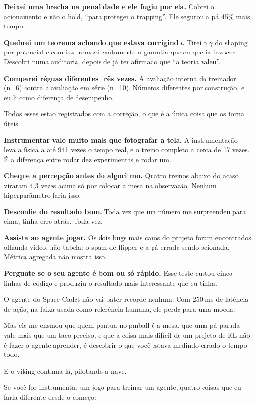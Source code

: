 \documentclass[10pt,a4paper,twoside,twocolumn]{scrartcl}
\begin{document}
\textbf{Deixei uma brecha na penalidade e ele fugiu por ela.} Cobrei o
acionamento e não o hold, ``para proteger o trapping''. Ele segurou a pá
45\% mais tempo.

\textbf{Quebrei um teorema achando que estava corrigindo.} Tirei o
\(\gamma\) do shaping por potencial e com isso removi exatamente a
garantia que eu queria invocar. Descobri numa auditoria, depois de já
ter afirmado que ``a teoria valeu''.

\textbf{Comparei réguas diferentes três vezes.} A avaliação interna do
treinador (n=6) contra a avaliação em série (n=10). Números diferentes
por construção, e eu li como diferença de desempenho.

Todos esses estão registrados com a correção, o que é a única coisa que
os torna úteis.

\textbf{Instrumentar vale muito mais que fotografar a tela.} A
instrumentação leva a física a até 941 vezes o tempo real, e o treino
completo a cerca de 17 vezes. É a diferença entre rodar dez experimentos
e rodar um.

\textbf{Cheque a percepção antes do algoritmo.} Quatro treinos abaixo do
acaso viraram 4,3 vezes acima só por colocar a mesa na observação.
Nenhum hiperparâmetro faria isso.

\textbf{Desconfie do resultado bom.} Toda vez que um número me
surpreendeu para cima, tinha erro atrás. Toda vez.

\textbf{Assista ao agente jogar.} Os dois bugs mais caros do projeto
foram encontrados olhando vídeo, não tabela: o spam de flipper e a pá
errada sendo acionada. Métrica agregada não mostra isso.

\textbf{Pergunte se o seu agente é bom ou só rápido.} Esse teste custou
cinco linhas de código e produziu o resultado mais interessante que eu
tinha.

O agente do Space Cadet não vai bater recorde nenhum. Com 250 ms de
latência de ação, na faixa usada como referência humana, ele perde para
uma moeda.

Mas ele me ensinou que quem pontua no pinball é a mesa, que uma pá
parada vale mais que um taco preciso, e que a coisa mais difícil de um
projeto de RL não é fazer o agente aprender, é descobrir o que você
estava medindo errado o tempo todo.

E o viking continua lá, pilotando a nave.

Se você for instrumentar um jogo para treinar um agente, quatro coisas
que eu faria diferente desde o começo:
\end{document}
